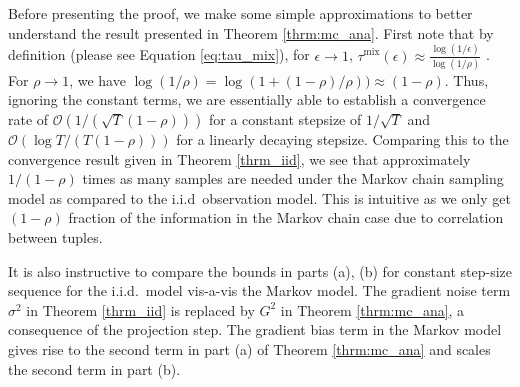 \documentclass{colt2018} %
\DeclareMathOperator*{\mix}{mix}
\begin{document}
Before presenting the proof, we make some simple approximations to better understand the result presented in Theorem \ref{thrm:mc_ana}. First note that by definition (please see Equation \eqref{eq:tau_mix}), for $\epsilon \rightarrow 1$, $\tau^{\mix}(\epsilon) \approx \frac{\log (1/\epsilon)}{\log (1/\rho)}$ . For $\rho \rightarrow 1$, we have $\log(1/\rho) = \log(1+ (1-\rho)/\rho)) \approx (1-\rho)$. Thus, ignoring the constant terms, we are essentially able to establish a convergence rate of $\mathcal{O} (1/(\sqrt{T}(1-\rho)))$ for a constant stepsize of $1/\sqrt{T}$ and $\mathcal{O} (\log T /(T (1-\rho)))$ for a linearly decaying stepsize. Comparing this to the convergence result given in Theorem \ref{thrm_iid}, we see that approximately $1/(1-\rho)$ times as many samples are needed under the Markov chain sampling model as compared to the i.i.d \,observation model. This is intuitive as we only get $(1-\rho)$ fraction of the information in the Markov chain case due to correlation between tuples.

It is also instructive to compare the bounds in parts (a), (b) for constant step-size sequence for the i.i.d.\ model vis-a-vis the Markov model. The gradient noise term $\sigma^2$ in Theorem \ref{thrm_iid} is replaced by $G^2$ in Theorem \ref{thrm:mc_ana}, a consequence of the projection step. The gradient bias term in the Markov model gives rise to the second term in part (a) of Theorem \ref{thrm:mc_ana} and scales the second term in part (b).
\end{document}
